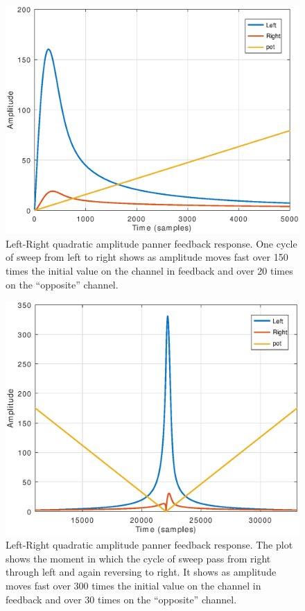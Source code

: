 \documentclass{article}
\begin{document}
\begin{figure}[h]
\centering
\includegraphics[width=1\columnwidth]{lrpanfb_init}
\caption{Left-Right quadratic amplitude panner feedback response. One cycle of sweep from left to right shows as amplitude moves fast over 150 times the initial value on the channel in feedback and over 20 times on the “opposite” channel.}
\label{fig:lrpanfb1}
\end{figure}

\begin{figure}[h]
\centering
\includegraphics[width=1\columnwidth]{lrpanfbpot2}
\caption{Left-Right quadratic amplitude panner feedback response. The plot shows the moment in which the cycle of sweep pass from right through left and again reversing to right. It shows as amplitude moves fast over 300 times the initial value on the channel in feedback and over 30 times on the “opposite” channel.}
\label{fig:lrpanfb2}
\end{figure}
\end{document}
